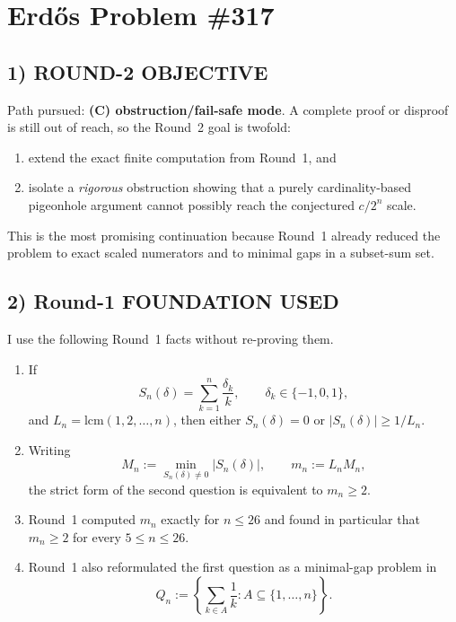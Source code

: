 \section{Erd\H{o}s Problem \#317}

\subsection*{1) ROUND-2 OBJECTIVE}
Path pursued: \textbf{(C) obstruction/fail-safe mode}.  A complete proof or disproof is still out of reach, so the Round~2 goal is twofold:
\begin{enumerate}
\item extend the exact finite computation from Round~1, and
\item isolate a \emph{rigorous} obstruction showing that a purely cardinality-based pigeonhole argument cannot possibly reach the conjectured $c/2^n$ scale.
\end{enumerate}
This is the most promising continuation because Round~1 already reduced the problem to exact scaled numerators and to minimal gaps in a subset-sum set.

\subsection*{2) Round-1 FOUNDATION USED}
I use the following Round~1 facts without re-proving them.
\begin{enumerate}
\item If
\[
S_n(\delta)=\sum_{k=1}^n \frac{\delta_k}{k}, \qquad \delta_k\in\{-1,0,1\},
\]
and $L_n=\mathrm{lcm}(1,2,\dots,n)$, then either $S_n(\delta)=0$ or $|S_n(\delta)|\ge 1/L_n$.
\item Writing
\[
M_n:=\min_{S_n(\delta)\neq 0} |S_n(\delta)|,
\qquad
m_n:=L_n M_n,
\]
the strict form of the second question is equivalent to $m_n\ge 2$.
\item Round~1 computed $m_n$ exactly for $n\le 26$ and found in particular that $m_n\ge 2$ for every $5\le n\le 26$.
\item Round~1 also reformulated the first question as a minimal-gap problem in
\[
Q_n:=\left\{\sum_{k\in A}\frac1k : A\subseteq \{1,\dots,n\}\right\}.
\]
\end{enumerate}

